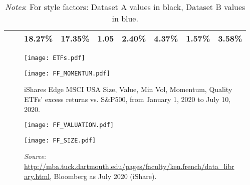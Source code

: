 \documentclass[12pt]{article}
\begin{document}
\begin{table}[H]
{\begin{tabular}{@{}llccccccc@{}}
                              &                   & {\color[HTML]{303498} 18.27\%}                                   & {\color[HTML]{303498} 17.35\%}                                       & {\color[HTML]{303498} 1.05}                            & {\color[HTML]{303498} 2.40\%}                                 & {\color[HTML]{303498} 4.37\%}                                & {\color[HTML]{303498} 1.57\%}                                 & {\color[HTML]{303498} 3.58\%}                               \\ \bottomrule
\end{tabular}}
\medskip
\caption*{\textit{Notes}: For style factors: Dataset A values in black, Dataset B values in blue.}
\end{table}

\text{\\}

\begin{figure}[H]
\begin{minipage}[b]{.5\textwidth}
\centering
\caption{iShares Edge MSCI USA Size, Value, Min Vol, Momentum, Quality ETFs' excess returns vs. S\&P500, from January 1, 2020 to July 10, 2020.}
\texttt{[image: ETFs.pdf]}
\label{iShare_ETFs}
\end{minipage}
\hfill
\begin{minipage}[b]{.5\textwidth}
\centering
{}
\texttt{[image: FF\_MOMENTUM.pdf]}
\label{MOM}
\end{minipage}
\end{figure}

\begin{figure}[H]
\begin{minipage}[b]{.5\textwidth}
\centering
{}
\texttt{[image: FF\_VALUATION.pdf]}
\label{HML}
\end{minipage}%
\hfill
\begin{minipage}[b]{.5\textwidth}
\centering
{}
\texttt{[image: FF\_SIZE.pdf]}
\label{SMB}
\end{minipage}
\caption*{\textit{Source}: \url{http://mba.tuck.dartmouth.edu/pages/faculty/ken.french/data_library.html}, Bloomberg as July 2020 (iShare).}
\end{figure}

\text{\\}
\end{document}

